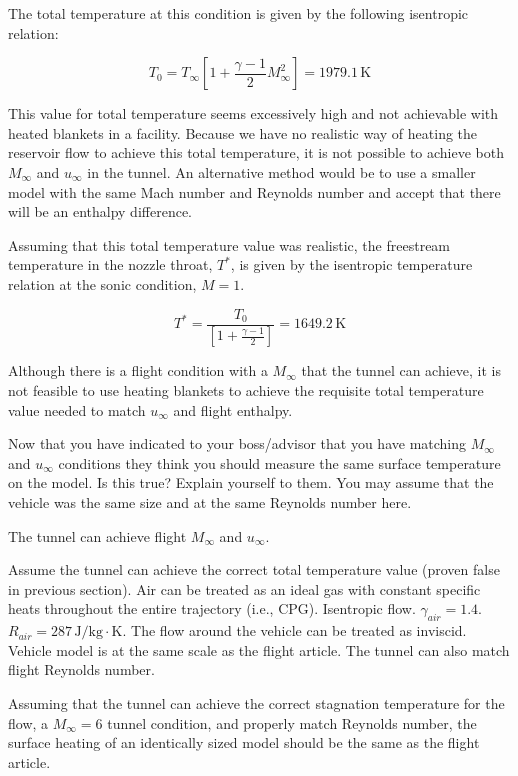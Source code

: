 \documentclass[../main.tex]{subfiles}
\begin{document}
The total temperature at this condition is given by the following isentropic relation:

\[
    T_0 = T_\infty \left[{1 + \frac{\gamma-1}{2}M_\infty^2}\right] = 1979.1 \, \unit{\kelvin}
\] 

This value for total temperature seems excessively high and not achievable with heated blankets in a facility. 
Because we have no realistic way of heating the reservoir flow to achieve this total temperature, it is not possible to achieve both \(M_\infty\) and \(u_\infty\) in the tunnel.
An alternative method would be to use a smaller model with the same Mach number and Reynolds number and accept that there will be an enthalpy difference.

Assuming that this total temperature value was realistic, the freestream temperature in the nozzle throat, \(T^*\), is given by the isentropic temperature relation at the sonic condition, \(M=1\).

\[
    T^* = \frac{T_0}{\left[{1 + \frac{\gamma-1}{2}}\right]} = 1649.2 \, \unit{\kelvin}
\] 

\discussion{}

Although there is a flight condition with a \(M_\infty\) that the tunnel can achieve, it is not feasible to use heating blankets to achieve the requisite total temperature value needed to match \(u_\infty\) and flight enthalpy. 

\clearpage

Now that you have indicated to your boss/advisor that you have matching \(M_\infty\) and \(u_\infty\) conditions they think you should measure the same surface temperature on the model. 
Is this true? 
Explain yourself to them.
You may assume that the vehicle was the same size and at the same Reynolds number here.

\givens{}
The tunnel can achieve flight \(M_\infty\) and \(u_\infty\).

\assumptions{}
Assume the tunnel can achieve the correct total temperature value (proven false in previous section).
Air can be treated as an ideal gas with constant specific heats throughout the entire trajectory (i.e., CPG).
Isentropic flow.
\(\gamma_{air} = 1.4\). 
\(R_{air} = 287 \, \unit{\joule/\kilogram\cdot\kelvin}\). 
The flow around the vehicle can be treated as inviscid.
Vehicle model is at the same scale as the flight article.
The tunnel can also match flight Reynolds number.

\solution{}

Assuming that the tunnel can achieve the correct stagnation temperature for the flow, a \(M_\infty = 6\) tunnel condition, and properly match Reynolds number, the surface heating of an identically sized model should be the same as the flight article.
\end{document}
